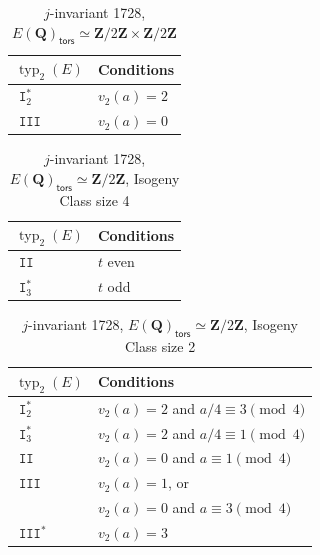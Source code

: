 \documentclass[10pt,a4paper]{amsart}
\DeclareMathOperator{\I}{\mathtt{I}}
\DeclareMathOperator{\II}{\mathtt{II}}
\DeclareMathOperator{\III}{\mathtt{III}}
\newcommand{\Q}{\mathbf{Q}}
\newcommand{\Z}{\mathbf{Z}}
\newcommand{\tors}{\mathsf{tors}}
\DeclareMathOperator{\typ}{{typ}}
\begin{document}
\begin{center}
 \begin{table}[h]
 \begin{tabular}{|l|l|}
 \hline
$\typ_2(E)$ & Conditions \\
 \hline
 $\I_2^*$ & $v_2(a) = 2$\\
 $\III$ & $v_2(a) = 0$\\ 
  \hline 
\end{tabular}
 \caption{$j$-invariant 1728, $E(\Q)_\tors \simeq \Z/2\Z \times \Z/2\Z$} \label{j1728_(2,2)tors}
 \end{table}
 \end{center}

\begin{center}
\begin{table}[h]
 \begin{tabular}{|l|l|}
 \hline
$\typ_2(E)$ & Conditions \\
 \hline
 $\II$ & $t$ even \\
 $\I_3^*$ & $t$ odd \\
\hline
\end{tabular}
 \caption{$j$-invariant 1728, $E(\Q)_\tors \simeq \Z/2\Z$, Isogeny Class size 4} \label{j1728-Z2tors-size4}
 \end{table}
  \end{center}

\begin{center}
 \begin{table}[h]
 \begin{tabular}{|l|l|}
 \hline
$\typ_2(E)$ & Conditions \\
 \hline
 $\I_2^*$ & $v_2(a)=2$ and $a/4 \equiv 3 \pmod{4}$ \\
$\I_3^*$ & $v_2(a) = 2$ and $a/4 \equiv 1 \pmod{4}$\\
$\II$ & $v_2(a)=0$ and $a \equiv 1 \pmod{4}$\\
$\III$ & $v_2(a)=1$, or \\
 &$v_2(a)=0$ and $a \equiv 3 \pmod{4}$\\
 $\III^*$ & $v_2(a)=3$ \\
\hline
\end{tabular}
 \caption{$j$-invariant 1728, $E(\Q)_\tors \simeq \Z/2\Z$, Isogeny Class size 2} \label{j1728-generic}
 \end{table}
 \end{center}
\end{document}
